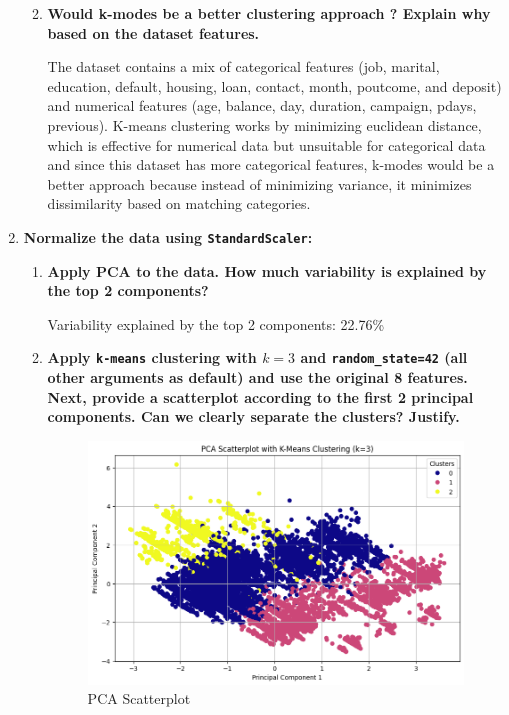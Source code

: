 \documentclass[12pt]{article}
\begin{document}
\begin{enumerate}
\begin{enumerate}[label=\alph*)]
        \vspace{10pt}
        \item \textbf{Would k-modes be a better clustering approach ? Explain why based on the dataset
        features.}

        \vspace{10pt}
        The dataset contains a mix of categorical features (job, marital, education, default, housing, loan, contact, month, poutcome, and deposit) and numerical features (age, balance, day, duration, campaign, pdays, previous). K-means clustering works by minimizing euclidean distance, which is effective for numerical data but unsuitable for categorical data and since this dataset has more categorical features, k-modes would be a better approach because instead of minimizing variance, it minimizes dissimilarity based on matching categories.
        
    \end{enumerate}

    \item \textbf{Normalize the data using \texttt{StandardScaler}:}
    
    \begin{enumerate}[label=\alph*)]
        \item \textbf{Apply PCA to the data. How much variability is explained by the top 2 components?}
        
        

        \vspace{10pt}
        Variability explained by the top 2 components: 22.76\%
        \vspace{10pt}
        
        \item \textbf{Apply \texttt{k-means} clustering with $k=3$ and \texttt{random\_state=42} (all other arguments as default) and use the original 8 features. Next, provide a scatterplot according to the ﬁrst 2 principal components. Can we clearly separate the clusters? Justify.}
    
        \vspace{10pt}
        
        \begin{figure}[H]
            \centering
            \includegraphics[width=12cm]{./Part II/2_b.png}
            \caption{PCA Scatterplot}
        \end{figure}


\end{enumerate}
\end{enumerate}
\end{document}

